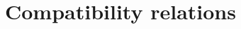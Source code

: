\documentclass[reqno,centertags,11pt,draft]{amsart}
\begin{document}




\section{Compatibility relations}\label{ss:CC}
\end{document}
